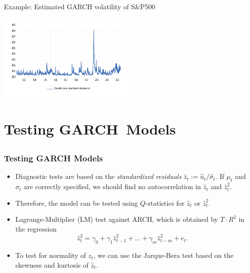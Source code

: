 \begin{frame}%

\begin{block}{Example: Estimated GARCH volatility of S\&P500}
\centerline{\includegraphics[height=1.7in]{sp500_sigmas}}
\end{block}

\end{frame}%
\section[Testing]{Testing GARCH\ Models}\subsection*{}
\begin{frame}%

\frametitle{Testing GARCH Models}

\begin{itemize}
\item Diagnostic tests are based on the \emph{\color{red}standardized
residuals} $\hat{z}_{t}:=\hat{u}_{t}/\hat{\sigma}_{t}$. If $\mu _{t}$ and $%
\sigma _{t}$ are correctly specified, we should find no autocorrelation in $%
\hat{z}_{t}$ and $\hat{z}_{t}^{2}$.

\item Therefore, the model can be tested using $Q$-statistics for $\hat{z}%
_{t}$ or $\hat{z}_{t}^{2}$.

\item Lagrange-Multiplier (LM) test against ARCH, which is obtained by $%
T\cdot R^{2}$ in the regression%
\begin{equation*}
\hat{z}_{t}^{2}=\gamma _{0}+\gamma _{1}\hat{z}_{t-1}^{2}+\ldots +\gamma _{m}%
\hat{z}_{t-m}^{2}+e_{t}.
\end{equation*}

\item To test for normality of $z_{t}$, we can use the Jarque-Bera test
based on the skewness and kurtosis of $\hat{z}_{t}$.
\end{itemize}

\end{frame}%

